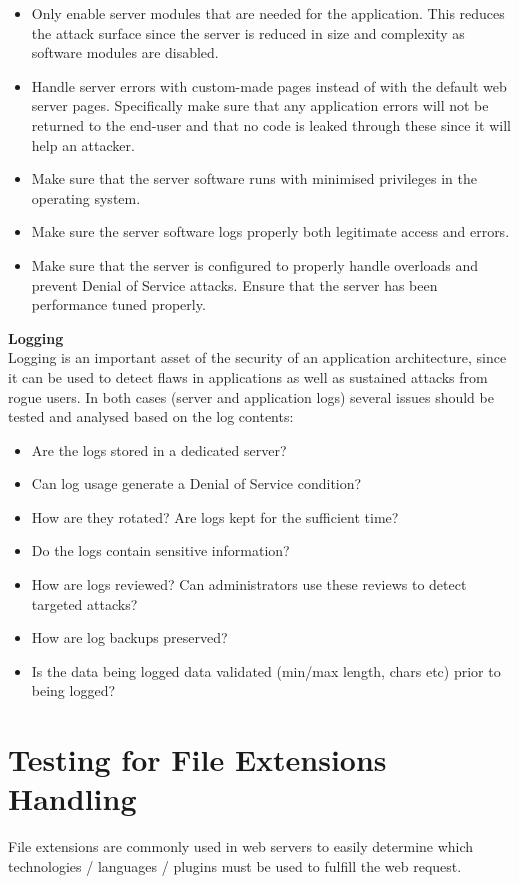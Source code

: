 		\begin{itemize}
			\item Only enable server modules that are needed for the application. This reduces 
			the attack surface since the server is reduced in size and complexity as software 
			modules are disabled.
			\item Handle server errors with custom-made pages instead of with the default web 
			server pages. Specifically make sure that any application errors will not be returned 
			to the end-user and that no code is leaked through these since it will help an attacker. 
			\item Make sure that the server software runs with minimised privileges in the operating 
			system. 
			\item Make sure the server software logs properly both legitimate access and errors.
			\item Make sure that the server is configured to properly handle overloads and prevent 
			Denial of Service attacks. Ensure that the server has been performance tuned properly.
		\end{itemize}

	{\bf Logging} \\
	Logging is an important asset of the security of an application architecture, since it can be used 
	to detect flaws in applications as well as sustained attacks from rogue users. 
	In both cases (server and application logs) several issues should be tested and analysed based on 
	the log contents:
		\begin{itemize}
			\item Are the logs stored in a dedicated server?
			\item Can log usage generate a Denial of Service condition?
			\item How are they rotated? Are logs kept for the sufficient time?
			\item Do the logs contain sensitive information?
			\item How are logs reviewed? Can administrators use these reviews to detect 
			targeted attacks?
			\item How are log backups preserved?
			\item Is the data being logged data validated (min/max length, chars etc) 
			prior to being logged?
		\end{itemize}

\section{Testing for File Extensions Handling}
	File extensions are commonly used in web servers to easily determine which technologies 
	/ languages / plugins must be used to fulfill the web request.

